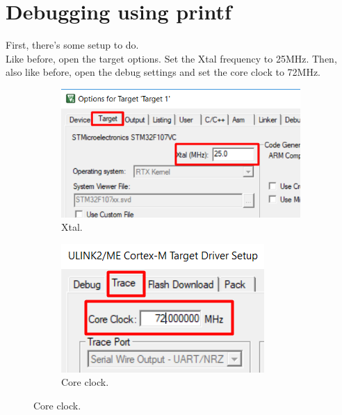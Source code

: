 \documentclass{article}
\begin{document}
\section{Debugging using printf}
First, there's some setup to do.\\
Like before, open the target options. Set the Xtal frequency to 25MHz. Then, also like before,
open the debug settings and set the core clock to 72MHz.
\begin{figure}[H]
    \centering
    \begin{subfigure}[b]{0.45\linewidth}
        \includegraphics[width=\linewidth]{pics/Xtal.png}
        \caption{Xtal.}
    \end{subfigure}
    \begin{subfigure}[b]{0.45\linewidth}
        \includegraphics[width=\linewidth]{pics/DebugCoreClock.png}
        \caption{Core clock.}
    \end{subfigure}
    \label{fig:Xtal}
\end{figure}
\end{document}
